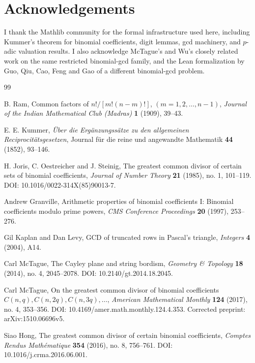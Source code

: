\documentclass[11pt]{article}
\begin{document}
\section*{Acknowledgements}

I thank the Mathlib community for the formal infrastructure used here, including
Kummer's theorem for binomial coefficients, digit lemmas, gcd machinery, and
$p$-adic valuation results.  I also acknowledge McTague's and Wu's closely
related work on the same restricted binomial-gcd family, and the Lean
formalization by Guo, Qiu, Cao, Feng and Gao of a different binomial-gcd problem.

\begin{thebibliography}{99}

B. Ram, Common factors of $n!/[m!(n-m)!]$, $(m=1,2,\ldots,n-1)$,
\emph{Journal of the Indian Mathematical Club (Madras)} \textbf{1} (1909),
39--43.

E. E. Kummer, \emph{\"Uber die Erg\"anzungss\"atze zu den allgemeinen
Reciprocit\"atsgesetzen}, Journal f\"ur die reine und angewandte Mathematik
\textbf{44} (1852), 93--146.

H. Joris, C. Oestreicher and J. Steinig, The greatest common divisor of certain
sets of binomial coefficients, \emph{Journal of Number Theory} \textbf{21}
(1985), no. 1, 101--119. DOI: 10.1016/0022-314X(85)90013-7.

Andrew Granville, Arithmetic properties of binomial coefficients I: Binomial
coefficients modulo prime powers, \emph{CMS Conference Proceedings} \textbf{20}
(1997), 253--276.

Gil Kaplan and Dan Levy, GCD of truncated rows in Pascal's triangle,
\emph{Integers} \textbf{4} (2004), A14.

Carl McTague, The Cayley plane and string bordism, \emph{Geometry \& Topology}
\textbf{18} (2014), no. 4, 2045--2078. DOI: 10.2140/gt.2014.18.2045.

Carl McTague, On the greatest common divisor of binomial coefficients
$C(n,q), C(n,2q), C(n,3q),\ldots$, \emph{American Mathematical Monthly}
\textbf{124} (2017), no. 4, 353--356. DOI: 10.4169/amer.math.monthly.124.4.353.
Corrected preprint: arXiv:1510.06696v5.

Siao Hong, The greatest common divisor of certain binomial coefficients,
\emph{Comptes Rendus Math\'ematique} \textbf{354} (2016), no. 8, 756--761.
DOI: 10.1016/j.crma.2016.06.001.


\end{thebibliography}
\end{document}
